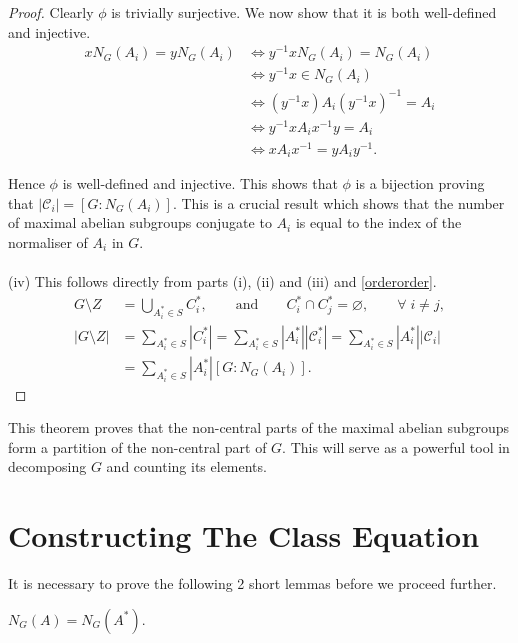 \begin{proof}
Clearly $\phi$ is trivially surjective. We now show that it is both well-defined and injective.
\begin{align*} xN_G(A_i) = yN_G(A_i) &\iff y^{-1}xN_G(A_i) = N_G(A_i) \\
&\iff y^{-1}x \in N_G(A_i) \\
&\iff (y^{-1}x)A_i(y^{-1}x)^{-1} = A_i \\
&\iff y^{-1}xA_ix^{-1}y = A_i \\
&\iff xA_ix^{-1} = yA_iy^{-1}.
\end{align*}

Hence $\phi$ is well-defined and injective. This shows that $\phi$ is a bijection proving that $|\mathcal{C}_i| = [G:N_G(A_i)]$. This is a crucial result which shows that the number of maximal abelian subgroups conjugate to $A_i$ is equal to the index of the normaliser of $A_i$ in $G$. \\
\\
(iv) This follows directly from parts (i), (ii) and (iii) and \eqref{orderorder}.
\begin{align*} G \! \setminus \! Z &= \bigcup\limits_{A_i^* \in S} C_i^*,  \qquad \text{and}  \qquad C_i^* \cap C_j^* = \varnothing, \qquad \forall \;  i \neq j, \\
 |G \! \setminus \! Z| &=  \sum_{A_i^* \in S} |C_i^*| = \sum_{A_i^* \in S} |A_i^*||\mathcal{C}_i^*| = \sum_{A_i^* \in S} |A_i^*||\mathcal{C}_i|
\\ &= \sum_{A_i^* \in S} |A_i^*| [G:N_G(A_i)].
\end{align*}

\end{proof}

This theorem proves that the non-central parts of the maximal abelian subgroups form a partition of the non-central part of $G$. This will serve as a powerful tool in decomposing $G$ and counting its elements.

\section{Constructing The Class Equation}

It is necessary to prove the following 2 short lemmas before we proceed further.
 
\begin{lemma}
\label{normalizer_noncentral_eq}
 $N_G(A) =N_G(A^*)$.
\end{lemma}

